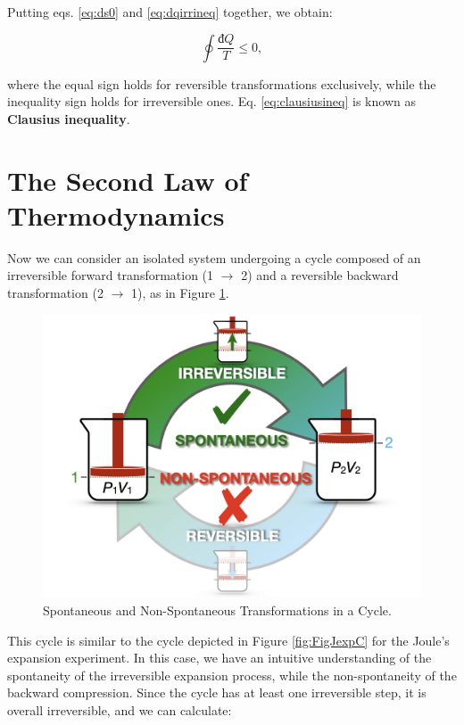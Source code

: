 \documentclass[
]{book}
\theoremstyle{definition}
\theoremstyle{definition}
\theoremstyle{definition}
\theoremstyle{remark}
\begin{document}
Putting eqs. \eqref{eq:ds0} and \eqref{eq:dqirrineq} together, we obtain:

\begin{equation}
\oint \frac{đQ}{T} \leq 0,
\label{eq:clausiusineq}
\end{equation}

where the equal sign holds for reversible transformations exclusively, while the inequality sign holds for irreversible ones. Eq. \eqref{eq:clausiusineq} is known as \textbf{Clausius inequality}.

\hypertarget{secondlaw}{%
\section{The Second Law of Thermodynamics}\label{secondlaw}}

Now we can consider an isolated system undergoing a cycle composed of an irreversible forward transformation (1 \(\rightarrow\) 2) and a reversible backward transformation (2 \(\rightarrow\) 1), as in Figure \ref{fig:FigJexpC2}.

\begin{figure}

{\centering \includegraphics[width=0.8\linewidth]{./img/OEP_Figures.011} 

}

\caption{Spontaneous and Non-Spontaneous Transformations in a Cycle.}\label{fig:FigJexpC2}
\end{figure}

This cycle is similar to the cycle depicted in Figure \ref{fig:FigJexpC} for the Joule's expansion experiment. In this case, we have an intuitive understanding of the spontaneity of the irreversible expansion process, while the non-spontaneity of the backward compression. Since the cycle has at least one irreversible step, it is overall irreversible, and we can calculate:
\end{document}
